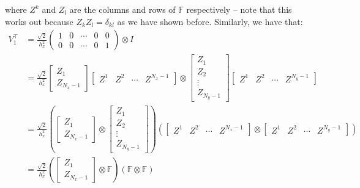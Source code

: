 \documentclass[reqno]{article}
\begin{document}
	where $Z^k$ and $Z_l$ are the columns and rows of $\mathbb{F}$ respectively -- note that this works out because $Z_k Z_l = \delta_{kl}$ as we have shown before. Similarly, we have that:
	\begin{equation}
	\begin{split}
		V_1^\top &= \frac{\sqrt{2}}{h_x^2}
		\begin{pmatrix}
			1 &0 &\cdots &0 &0 \\
			0 &0 &\cdots &0 &1
		\end{pmatrix}
		\otimes I \\
		&= \frac{\sqrt{2}}{h_x^2} 
		\begin{bmatrix}
			Z_1 \\
			Z_{N_x - 1}
		\end{bmatrix}
		\begin{bmatrix}
			Z^1 & Z^2 &\cdots & Z^{N_x - 1}
		\end{bmatrix}
		\otimes
		\begin{bmatrix}
			Z_1 \\
			Z_2 \\
			\vdots \\
			Z_{N_y - 1}
		\end{bmatrix}
		\begin{bmatrix}
			Z^1 & Z^2 &\cdots & Z^{N_y - 1}
		\end{bmatrix} \\
		&= \frac{\sqrt{2}}{h_x^2} 
		\left(
		\begin{bmatrix}
			Z_1 \\
			Z_{N_x - 1}
		\end{bmatrix}
		\otimes
		\begin{bmatrix}
			Z_1 \\
			Z_2 \\
			\vdots \\
			Z_{N_y - 1}
		\end{bmatrix}
		\right)
		\left(
		\begin{bmatrix}
			Z^1 &Z^2 &\cdots &Z^{N_x - 1}
		\end{bmatrix}
		\otimes
		\begin{bmatrix}
			Z^1 &Z^2 &\cdots &Z^{N_y - 1}
		\end{bmatrix}
		\right) \\
		&= \frac{\sqrt{2}}{h_x^2}
		\left(
		\begin{bmatrix}
			Z_1 \\
			Z_{N_x - 1}
		\end{bmatrix}
		\otimes \mathbb{F}
		\right)
		\left( \mathbb{F}\otimes\mathbb{F}
		\right)
	\end{split}
	\end{equation}
	
\end{document}
